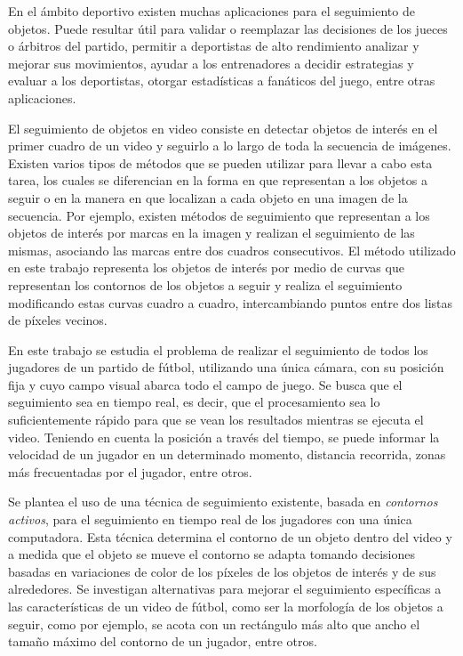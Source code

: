 \documentclass[a4paper,11pt]{report}
\begin{document}
En el ámbito deportivo existen muchas aplicaciones para el seguimiento de
objetos. Puede resultar útil para validar o reemplazar las decisiones de los
jueces o árbitros del partido, permitir a deportistas de alto rendimiento
analizar y mejorar sus movimientos, ayudar a los entrenadores a decidir
estrategias y evaluar a los deportistas, otorgar estadísticas a fanáticos del
juego, entre otras aplicaciones.

El seguimiento de objetos en video consiste en detectar objetos de interés en
el primer cuadro de un video y seguirlo a lo largo de toda la secuencia de
imágenes. Existen varios tipos de métodos que se pueden utilizar para llevar
a cabo esta tarea, los cuales se diferencian en la forma en que representan
a los objetos a seguir o en la manera en que localizan a cada objeto en una
imagen de la secuencia. Por ejemplo, existen métodos de seguimiento que
representan a los objetos de interés por marcas en la imagen y realizan el
seguimiento de las mismas, asociando las marcas entre dos cuadros consecutivos.
El método utilizado en este trabajo representa los objetos de interés por
medio de curvas que representan los contornos de los objetos a seguir y
realiza el seguimiento modificando estas curvas cuadro a cuadro,
intercambiando puntos entre dos listas de píxeles vecinos.

En este trabajo se estudia el problema de realizar el seguimiento de todos los
jugadores de un partido de fútbol, utilizando una única cámara, con su posición
fija y cuyo campo visual abarca todo el campo de juego. Se busca que el seguimiento sea en
tiempo real, es decir, que el procesamiento sea lo suficientemente rápido para
que se vean los resultados mientras se ejecuta el video. Teniendo en cuenta la posición
a través del tiempo, se puede informar la velocidad de un jugador en un
determinado momento, distancia recorrida, zonas más frecuentadas por el
jugador, entre otros.

Se plantea el uso de una técnica de seguimiento existente, basada en
\textit{contornos activos}, para el seguimiento en tiempo real de los
jugadores con una única computadora. Esta técnica determina el contorno de
un objeto dentro del video y a medida que el objeto se mueve el contorno se
adapta tomando decisiones basadas en variaciones de color de los píxeles de los
objetos de interés y de sus alrededores. Se investigan alternativas para
mejorar el seguimiento específicas a las características de un video de fútbol,
como ser la morfología de los objetos a seguir, como por ejemplo, se acota con
un rectángulo más alto que ancho el tamaño máximo del contorno de un jugador,
entre otros.
\end{document}
